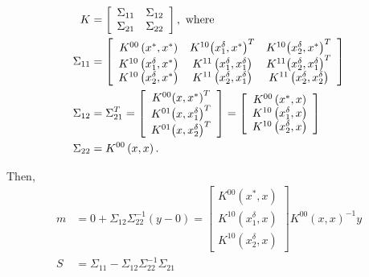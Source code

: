 \documentclass[12pt]{amsart}
\begin{document}
\begin{align}
K &= \left[ {\begin{array}{*{20}{c}}
{{\Sigma _{11}}}&{{\Sigma _{12}}}\\
{{\Sigma _{21}}}&{{\Sigma _{22}}} 
\end{array}} \right], \rm{\ where} \\
{\Sigma _{11}} &= \left[ {\begin{array}{*{20}{c}}
{{K^{00}}\left( {{x^*},{x^*}} \right)}&{{K^{10}}{{\left( {x_1^\delta ,{x^*}} \right)}^T}}&{{K^{10}}{{\left( {x_2^\delta ,{x^*}} \right)}^T}}\\
{{K^{10}}\left( {x_1^\delta ,{x^*}} \right)}&{{K^{11}}\left( {x_1^\delta ,x_1^\delta } \right)}&{{K^{11}}{{\left( {x_2^\delta ,x_1^\delta } \right)}^T}}\\
{{K^{10}}\left( {x_2^\delta ,{x^*}} \right)}&{{K^{11}}\left( {x_2^\delta ,x_1^\delta } \right)}&{{K^{11}}\left( {x_2^\delta ,x_2^\delta } \right)}
\end{array}} \right]\\
{\Sigma _{12}} &= \Sigma _{21}^T = \left[ {\begin{array}{*{20}{c}}
{{K^{00}}{{\left( {x,{x^*}} \right)}^T}}\\
{{K^{01}}{{\left( {x,x_1^\delta } \right)}^T}}\\
{{K^{01}}{{\left( {x,x_2^\delta } \right)}^T}}
\end{array}} \right] = \left[ {\begin{array}{*{20}{c}}
{{K^{00}}\left( {{x^*},x} \right)}\\
{{K^{10}}\left( {x_1^\delta ,x} \right)}\\
{{K^{10}}\left( {x_2^\delta ,x} \right)}
\end{array}} \right]\\
{\Sigma _{22}} &= {K^{00}}\left( {x,x} \right).
\end{align}

Then,
\begin{align}
m &= 0 + {\Sigma _{12}}\Sigma _{22}^{ - 1}\left( {y - 0} \right) = \left[ {\begin{array}{*{20}{c}}
{{K^{00}}\left( {{x^*},x} \right)}\\
{{K^{10}}\left( {x_1^\delta ,x} \right)}\\
{{K^{10}}\left( {x_2^\delta ,x} \right)}
\end{array}} \right]{K^{00}}{\left( {x,x} \right)^{ - 1}}y\\
S &= {\Sigma _{11}} - {\Sigma _{12}}\Sigma _{22}^{ - 1}{\Sigma _{21}}  
\end{align}
\end{document}

